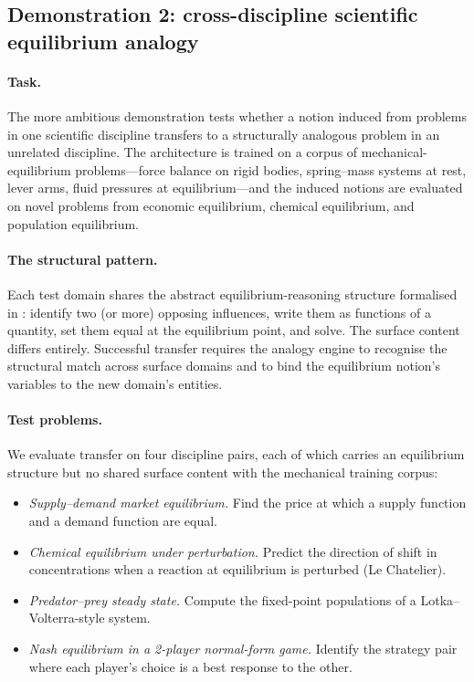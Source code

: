 \documentclass[11pt,a4paper]{article}
\theoremstyle{plain}
\theoremstyle{definition}
\theoremstyle{remark}
\begin{document}
\subsection{Demonstration 2: cross-discipline scientific equilibrium analogy}
\label{sec:emp-equilibrium}

\paragraph{Task.}
The more ambitious demonstration tests whether a notion induced from problems in one scientific discipline transfers to a structurally analogous problem in an unrelated discipline. The architecture is trained on a corpus of mechanical-equilibrium problems---force balance on rigid bodies, spring--mass systems at rest, lever arms, fluid pressures at equilibrium---and the induced notions are evaluated on novel problems from economic equilibrium, chemical equilibrium, and population equilibrium.

\paragraph{The structural pattern.}
Each test domain shares the abstract equilibrium-reasoning structure formalised in : identify two (or more) opposing influences, write them as functions of a quantity, set them equal at the equilibrium point, and solve. The surface content differs entirely. Successful transfer requires the analogy engine to recognise the structural match across surface domains and to bind the equilibrium notion's variables to the new domain's entities.

\paragraph{Test problems.}
We evaluate transfer on four discipline pairs, each of which carries an equilibrium structure but no shared surface content with the mechanical training corpus:
\begin{itemize}[topsep=2pt,itemsep=2pt]
  \item \emph{Supply--demand market equilibrium.} Find the price at which a supply function and a demand function are equal.
  \item \emph{Chemical equilibrium under perturbation.} Predict the direction of shift in concentrations when a reaction at equilibrium is perturbed (Le Chatelier).
  \item \emph{Predator--prey steady state.} Compute the fixed-point populations of a Lotka--Volterra-style system.
  \item \emph{Nash equilibrium in a 2-player normal-form game.} Identify the strategy pair where each player's choice is a best response to the other.
\end{itemize}
\end{document}
